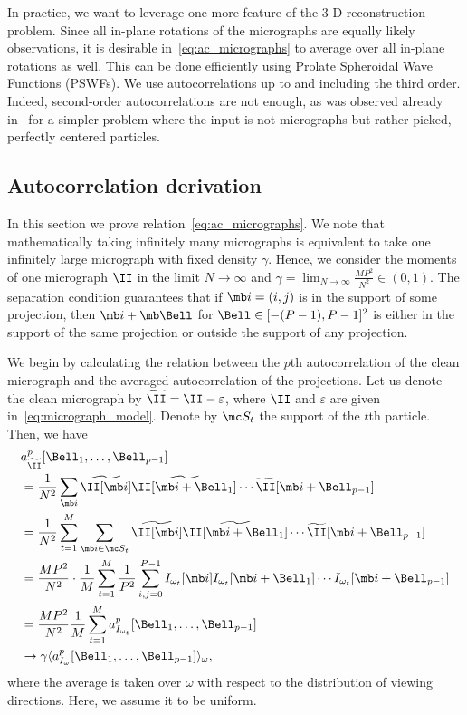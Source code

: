 \documentclass[9pt,twocolumn,twoside,lineno]{pnas-new}
\begin{document}
In practice, we want to leverage one more feature of the 3-D reconstruction problem.
Since all in-plane rotations of the micrographs are equally likely observations, 
it is desirable in~\eqref{eq:ac_micrographs} to average over all in-plane rotations as well.
This can be done efficiently using Prolate Spheroidal Wave Functions (PSWFs).  We use autocorrelations up to and including the  third order. Indeed, second-order autocorrelations are not enough, as was observed already in~\cite{kam1980reconstruction} for a simpler problem where the input is not micrographs but rather picked, perfectly centered particles. 


\subsection{Autocorrelation derivation} \label{sec:moment_derivation}

In this section we prove relation~\eqref{eq:ac_micrographs}. We note that mathematically taking infinitely many micrographs is equivalent to take one infinitely large micrograph with fixed density $\gamma$. Hence, we consider the moments of one micrograph $\II$ in the limit $N\to\infty$ and  $\gamma = \lim_{N\to\infty}\frac{MP^2}{N^2}\in(0,1)$. 
The separation condition guarantees that if $\mb i=(i,j)$ is in the support of some projection, then $\mb i + \mb \Bell$ for $\Bell\in[-(P-1),P-1]^2$ is either in the support of the same projection or outside the support of any projection. 

We begin by calculating the relation between the $p$th autocorrelation of the clean micrograph and the  averaged autocorrelation of the projections.
Let us denote the clean micrograph by $\widetilde \II = \II-\varepsilon$, where $\II$ and $\varepsilon$ are given in~\eqref{eq:micrograph_model}.     
Denote by $\mc S_t$ the support of the $t$th particle. 
Then, we have
\begin{align}
	& a^p_{\widetilde\II}[\Bell_1,\ldots, \Bell_{p-1}]  \nonumber\\
	&= \frac{1}{N^2}\sum_{\mb i}\widetilde\II[\mb i]\widetilde\II[\mb i + \Bell_1]\cdots \widetilde\II[\mb i + \Bell_{p-1}]\nonumber\\
&= \frac{1}{N^2}\sum_{t=1}^M\sum_{\mb i\in\mc S_t}\widetilde\II[\mb i]\widetilde\II[\mb i + \Bell_1]\cdots \widetilde\II[\mb i + \Bell_{p-1}] \nonumber\\ %
&= \frac{MP^2}{N^2}\cdot\frac{1}{M}\sum_{t=1}^M\frac{1}{P^2}\sum_{i,j=0}^{P-1} I_{\omega_t}[\mb i]I_{\omega_t}[\mb i+\Bell_1]\cdots I_{\omega_t}[\mb i + \Bell_{p-1}]\nonumber\\
&= \frac{MP^2}{N^2}\frac{1}{M}\sum_{t=1}^Ma^p_{I_{\omega_t}}[\Bell_1,\ldots, \Bell_{p-1}]\nonumber\\
&\to \gamma\langle a^p_{I_{\omega}}[\Bell_1,\ldots, \Bell_{p-1}]\rangle_{\omega},
\label{eq:general_moment}
\end{align}
where the average is taken over $\omega$ with respect to the distribution of viewing directions. Here, we assume it to be uniform.
\end{document}

